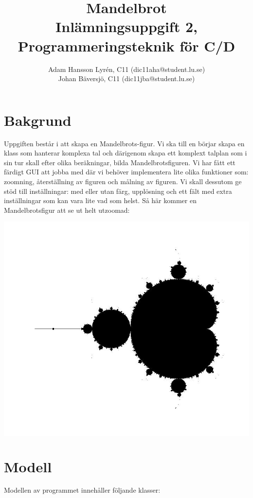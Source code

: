 \documentclass[a4paper]{article}
\title{Mandelbrot \\
	Inlämningsuppgift 2, Programmeringsteknik för C/D}
\author{Adam Hansson Lyrén, C11 (dic11aha@student.lu.se)\\
Johan Bäversjö, C11 (dic11jba@student.lu.se)}
\begin{document}

\maketitle
\thispagestyle{empty}
\newpage
\setcounter{page}{1}
\section{Bakgrund}
Uppgiften består i att skapa en Mandelbrots-figur. Vi ska till en börjar skapa en klass som hanterar komplexa tal och därigenom skapa ett komplext talplan som i sin tur skall efter olika beräkningar, bilda Mandelbrotsfiguren. Vi har fått ett färdigt GUI att jobba med där vi behöver implementera lite olika funktioner som: zoomning, återställning av figuren och målning av figuren.
\newline
Vi skall dessutom ge stöd till inställningar: med eller utan färg, upplösning och ett fält med extra inställningar som kan vara lite vad som helst.
\newline
\newline
Så här kommer en Mandelbrotsfigur att se ut helt utzoomad:
\begin{center}
\includegraphics[scale=0.29]{mandelbrot_print_1.jpg}
\end{center}
 
\section{Modell}
Modellen av programmet innehåller följande klasser:
\end{document}
